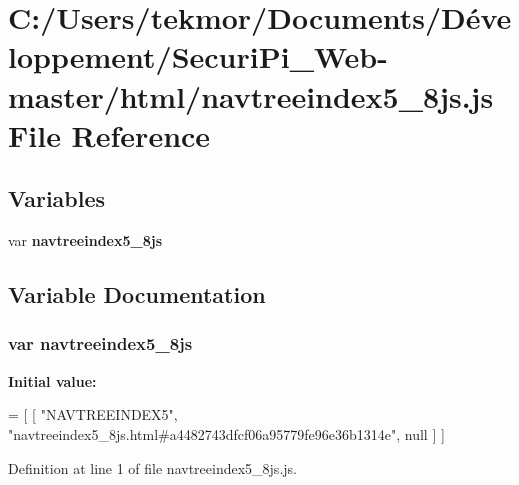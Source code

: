 \section{C\+:/\+Users/tekmor/\+Documents/\+Développement/\+Securi\+Pi\+\_\+\+Web-\/master/html/navtreeindex5\+\_\+8js.js File Reference}
\label{navtreeindex5__8js_8js}
\subsection*{Variables}
\begin{DoxyCompactItemize}
\item 
var {\bf navtreeindex5\+\_\+8js}
\end{DoxyCompactItemize}


\subsection{Variable Documentation}
\subsubsection[{navtreeindex5\+\_\+8js}]{\setlength{\rightskip}{0pt plus 5cm}var navtreeindex5\+\_\+8js}\label{navtreeindex5__8js_8js_a120e57101f84a3667680af5d83710abc}
{\bfseries Initial value\+:}
\begin{DoxyCode}
=
[
    [ \textcolor{stringliteral}{"NAVTREEINDEX5"}, \textcolor{stringliteral}{"navtreeindex5\_8js.html#a4482743dfcf06a95779fe96e36b1314e"}, null ]
]
\end{DoxyCode}


Definition at line 1 of file navtreeindex5\+\_\+8js.\+js.

